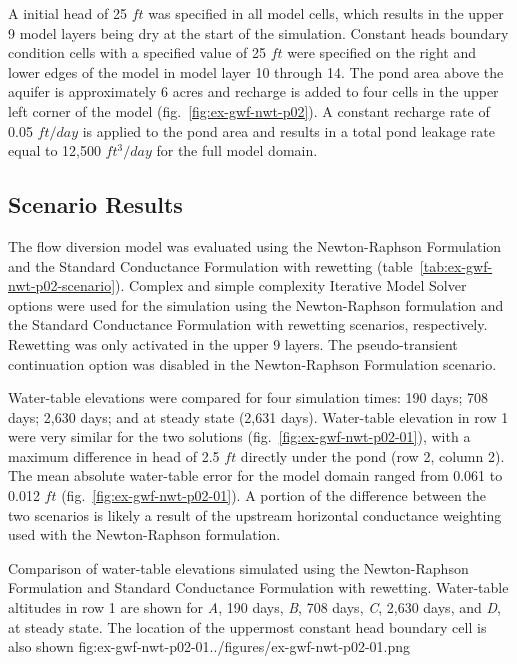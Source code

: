 A initial head of 25 $ft$ was specified in all model cells, which results in the upper 9 model layers being dry at the start of the simulation. Constant heads boundary condition cells with a specified value of 25 $ft$ were specified on the right and lower edges of the model in model layer 10 through 14. The pond area above the aquifer is approximately 6 acres and recharge is added to four cells in the upper left corner of the model (fig.~\ref{fig:ex-gwf-nwt-p02}). A constant recharge rate of 0.05 $ft/day$ is applied to the pond area and results in a total pond leakage rate equal to 12,500 $ft^3/day$ for the full model domain.


\subsection{Scenario Results}

The flow diversion model was evaluated using the Newton-Raphson Formulation and the Standard Conductance Formulation with rewetting (table~\ref{tab:ex-gwf-nwt-p02-scenario}). Complex and simple complexity Iterative Model Solver options were used for the simulation using the Newton-Raphson formulation and the Standard Conductance Formulation with rewetting scenarios, respectively. Rewetting was only activated in the upper 9 layers. The pseudo-transient continuation option \citep{modflow6framework} was disabled in the Newton-Raphson Formulation scenario.

Water-table elevations were compared for four simulation times: 190 days; 708 days; 2,630 days; and at steady state (2,631 days). Water-table elevation in row 1 were very similar for the two solutions (fig.~\ref{fig:ex-gwf-nwt-p02-01}), with a maximum difference in head of 2.5 $ft$ directly under the pond (row 2, column 2). The mean absolute water-table error for the model domain ranged from 0.061 to 0.012 $ft$ (fig.~\ref{fig:ex-gwf-nwt-p02-01}). A portion of the difference between the two scenarios is likely a result of the upstream horizontal conductance weighting used with the Newton-Raphson formulation. 



\begin{StandardFigure}{
                                      Comparison of water-table elevations simulated using the Newton-Raphson
                                      Formulation and Standard Conductance Formulation with rewetting.
                                      Water-table altitudes in row 1 are shown for \textit{A}, 190 days, \textit{B}, 
                                      708 days, \textit{C}, 2,630 days, and \textit{D}, at steady state.
                                      The location of the uppermost constant head boundary cell is also shown
                                     }{fig:ex-gwf-nwt-p02-01}{../figures/ex-gwf-nwt-p02-01.png}
\end{StandardFigure} 

